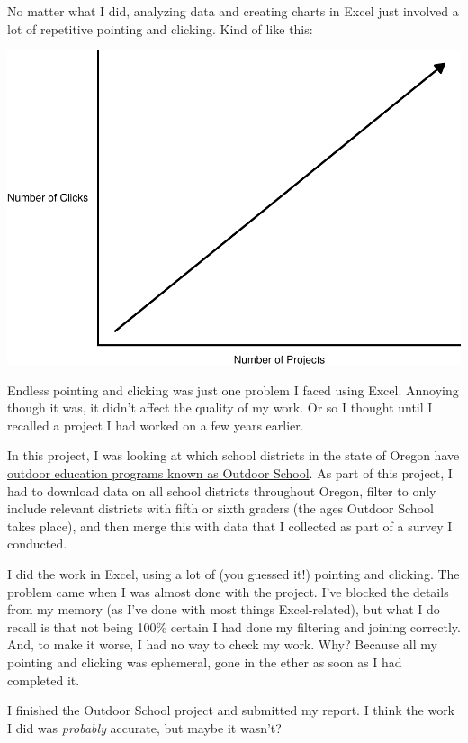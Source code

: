 \documentclass[
]{book}
\begin{document}
No matter what I did, analyzing data and creating charts in Excel just involved a lot of repetitive pointing and clicking. Kind of like this:

\includegraphics{introduction_files/figure-latex/unnamed-chunk-2-1.pdf}

Endless pointing and clicking was just one problem I faced using Excel. Annoying though it was, it didn't affect the quality of my work. Or so I thought until I recalled a project I had worked on a few years earlier.

In this project, I was looking at which school districts in the state of Oregon have \href{https://oregonstate.app.box.com/s/83g5sjdm88xgqdxfze0ri7qo4uff5sj7}{outdoor education programs known as Outdoor School}. As part of this project, I had to download data on all school districts throughout Oregon, filter to only include relevant districts with fifth or sixth graders (the ages Outdoor School takes place), and then merge this with data that I collected as part of a survey I conducted.

I did the work in Excel, using a lot of (you guessed it!) pointing and clicking. The problem came when I was almost done with the project. I've blocked the details from my memory (as I've done with most things Excel-related), but what I do recall is that not being 100\% certain I had done my filtering and joining correctly. And, to make it worse, I had no way to check my work. Why? Because all my pointing and clicking was ephemeral, gone in the ether as soon as I had completed it.

I finished the Outdoor School project and submitted my report. I think the work I did was \emph{probably} accurate, but maybe it wasn't?
\end{document}
